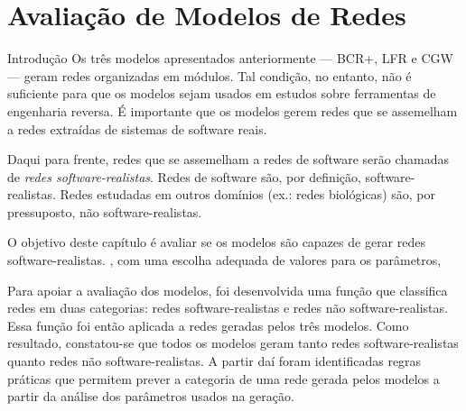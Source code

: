 \chapter{Avaliação de Modelos de Redes} \label{cap:avaliacao}

\begin{section}{Introdução}
Os três modelos apresentados anteriormente --- BCR+, LFR e CGW --- geram redes organizadas em módulos. Tal condição, no entanto, não é suficiente para que os modelos sejam usados em estudos sobre ferramentas de engenharia reversa. É importante que os modelos gerem redes que se assemelham a redes extraídas de sistemas de software reais.

Daqui para frente, redes que se assemelham a redes de software serão chamadas de \emph{redes software-realistas}. Redes de software são, por definição, software-realistas. Redes estudadas em outros domínios (ex.: redes biológicas) são, por pressuposto, não software-realistas.

O objetivo deste capítulo é avaliar se os modelos são capazes de gerar redes software-realistas. , com uma escolha adequada de valores para os parâmetros,

Para apoiar a avaliação dos modelos, foi desenvolvida uma função que classifica redes em duas categorias: redes software-realistas e redes não software-realistas. Essa função foi então aplicada a redes geradas pelos três modelos. Como resultado, constatou-se que todos os modelos geram tanto redes software-realistas quanto redes não software-realistas. A partir daí foram identificadas regras práticas que permitem prever a categoria de uma rede gerada pelos modelos a partir da análise dos parâmetros usados na geração.


\end{section}

